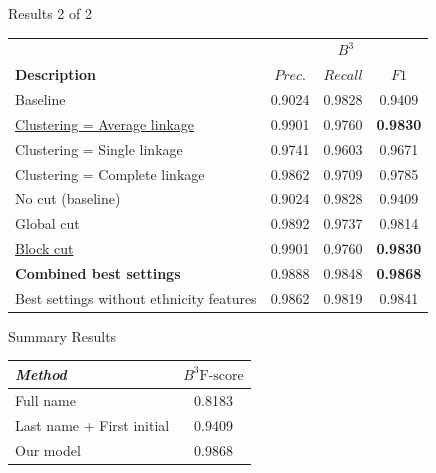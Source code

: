 \documentclass{beamer}
\begin{document}
\begin{frame}{Results 2 of 2}

\begin{table}
\centering
\begin{tabular}{|l|c c c |}
  \hline
                       & \multicolumn{3}{|c|}{\textbf{$B^{3}$}}\\
  \textbf{Description} & $Prec.$ & $Recall$ & $F1$ \\
  \hline
  \hline
Baseline & 0.9024 & 0.9828 & 0.9409  \\
\hline
\underline{Clustering = Average linkage} & 0.9901 & 0.9760 & \textbf{0.9830}  \\
Clustering = Single linkage & 0.9741 & 0.9603 & 0.9671  \\
Clustering = Complete linkage & 0.9862 & 0.9709 & 0.9785   \\
\hline
No cut (baseline) & 0.9024 & 0.9828 & 0.9409   \\
Global cut & 0.9892 & 0.9737 & 0.9814   \\
\underline{Block cut} & 0.9901 & 0.9760 & \textbf{0.9830} \\
\hline
\textbf{Combined best settings} & 0.9888 & 0.9848 & \textbf{0.9868}  \\
Best settings without ethnicity features & 0.9862 & 0.9819 & 0.9841 \\
\hline

\end{tabular}
\end{table}

\end{frame}


\begin{frame}{Summary Results}

\begin{table}
    \centering
    \begin{tabular}{| l c |}
    \hline
        \textit{Method} & \textit{$B^3 \text{F-score}$}  \\
    \hline
    \hline
    Full name & 0.8183 \\
    Last name + First initial & 0.9409 \\
    \hline
    Our model & {\color{blue} 0.9868} \\
    \hline
    \end{tabular}
\end{table}

\end{frame}
\end{document}
